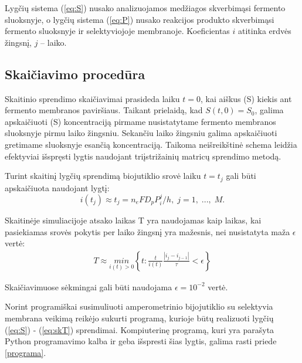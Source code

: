 \documentclass[12pt, a4paper, lithuanian]{article}
\begin{document}
Lygčių sistema (\ref{eq:S}) nusako analizuojamos medžiagos skverbimąsi fermento
sluoksnyje, o lygčių sistema (\ref{eq:P}) nusako reakcijos produkto skverbimąsi
fermento sluoksnyje ir selektyviojoje membranoje. Koeficientas $i$ atitinka
erdvės žingsnį, $j$ – laiko.

\subsection{Skaičiavimo procedūra}

Skaitinio sprendimo skaičiavimai prasideda laiku $t = 0$,
kai aiškus (S) kiekis ant fermento membranos paviršiaus. Taikant prielaidą, kad
$S(t, 0) = S_0$, galima apskaičiuoti (S) koncentraciją pirmame nusistatytame fermento
membranos sluoksnyje pirmu laiko žingsniu. Sekančiu laiko žingsniu galima
apskaičiuoti gretimame sluoksnyje esančią koncentraciją. Taikoma neišreikštinė
schema leidžia efektyviai išspręsti lygtis naudojant triįstrižainių matricų
sprendimo metodą.

Turint skaitinį lygčių sprendimą biojutiklio srovė laiku $t = t_j$ gali būti
apskaičiuota naudojant lygtį:
\begin{equation} 
    \label{eq:i-form}
    i(t_j) \approx t_j = n_eFD_pP_i^j/h,\; j=1,\;...,\;M. 
\end{equation}

Skaitinėje simuliacijoje atsako laikas T yra naudojamas kaip laikas, kai pasiekiamas 
srovės pokytis per laiko žingsnį yra mažesnis, nei nusistatyta maža $\epsilon$
vertė:
\begin{equation} 
\begin{aligned}
    \label{eq:skT}
    T \approx \underset{i(t)>0}{min}\left\{t:\frac{t}{i(t)} \frac{\left| i_j -
            i_{j-1}
    \right|} {\tau} < \epsilon \right\}
\end{aligned}
\end{equation}

Skaičiavimuose sėkmingai gali būti naudojama $\epsilon = 10^{-2}$ vertė. 

Norint programiškai susimuliuoti amperometrinio bijojutiklio su selektyvia
membrana veikimą reikėjo sukurti programą, kurioje būtų realizuoti lygčių
(\ref{eq:S}) - (\ref{eq:skT}) sprendimai. Kompiuterinę programą, kuri yra
parašyta Python programavimo kalba ir  geba išspresti šias
lygtis, galima rasti priede \ref{programa}.
\end{document}
